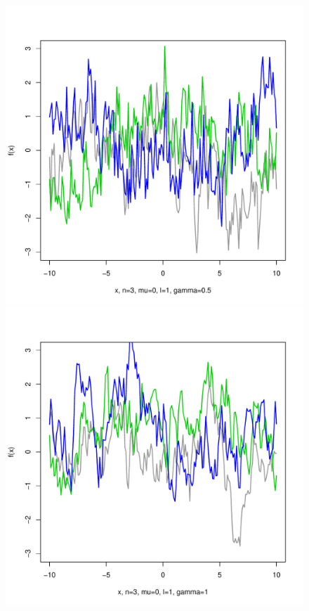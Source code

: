 \documentclass[12pt,letterpaper]{article}
\begin{document}
\begin{figure}
\begin{center}
\includegraphics[scale=0.2]{hw321/n3-m0-l1-g1.pdf}
\includegraphics[scale=0.2]{hw321/n3-m0-l1-g2.pdf}

\end{center}
\end{figure}
\end{document}
